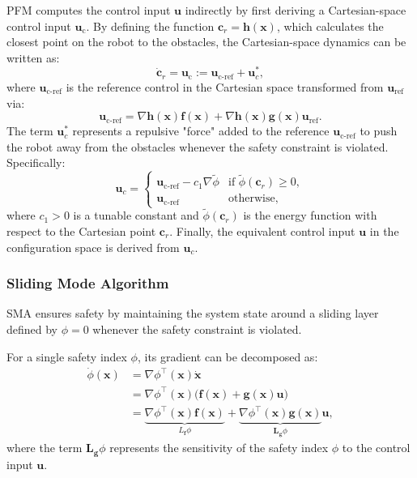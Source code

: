 PFM \cite{khatib1986real} computes the control input $\mathbf{u}$ indirectly by first deriving a Cartesian-space control input $\mathbf{u}_{\text{c}}$. By defining the function $\mathbf{c}_r = \mathbf{h}(\mathbf{x})$, which calculates the closest point on the robot to the obstacles, the Cartesian-space dynamics can be written as:
\begin{equation}
    \dot{\mathbf{c}}_r = \mathbf{u}_{\text{c}} := \mathbf{u}_{\text{c-ref}} + \mathbf{u}_c^*,
\end{equation}
where $\mathbf{u}_{\text{c-ref}}$ is the reference control in the Cartesian space transformed from $\mathbf{u}_{\text{ref}}$ via:
\begin{equation}
    \mathbf{u}_{\text{c-ref}} = \nabla{\mathbf{h}}(\mathbf{x}) \mathbf{f}(\mathbf{x}) + \nabla{\mathbf{h}}(\mathbf{x}) \mathbf{g}(\mathbf{x}) \mathbf{u}_{\text{ref}}.
\end{equation}
The term $\mathbf{u}_c^*$ represents a repulsive "force" added to the reference $\mathbf{u}_{\text{c-ref}}$ to push the robot away from the obstacles whenever the safety constraint is violated. Specifically:
\begin{equation}
    \mathbf{u}_c =
    \begin{cases} 
        \mathbf{u}_{\text{c-ref}} - c_1 \nabla \tilde{\phi} & \text{if } \tilde{\phi}(\mathbf{c}_r) \geq 0, \\
        \mathbf{u}_{\text{c-ref}} & \text{otherwise},
    \end{cases}
\end{equation}
where $c_1 > 0$ is a tunable constant and $\tilde{\phi}(\mathbf{c}_r)$ is the energy function with respect to the Cartesian point $\mathbf{c}_r$. Finally, the equivalent control input $\mathbf{u}$ in the configuration space is derived from $\mathbf{u}_c$.

\subsubsection{Sliding Mode Algorithm}

SMA \cite{gracia2013reactive} ensures safety by maintaining the system state around a sliding layer defined by $\phi = 0$ whenever the safety constraint is violated. 

For a single safety index $\phi$, its gradient can be decomposed as:
\begin{align}
    \dot{\phi}(\mathbf{x}) &= \nabla \phi^\top(\mathbf{x}) \dot{\mathbf{x}} \\ \nonumber
    &= \nabla \phi^\top(\mathbf{x}) \big( \mathbf{f}(\mathbf{x}) + \mathbf{g}(\mathbf{x}) \mathbf{u} \big) \\ \nonumber
    &= \underbrace{\nabla \phi^\top(\mathbf{x}) \mathbf{f}(\mathbf{x})}_{L_\mathbf{f} \phi} + \underbrace{\nabla \phi^\top(\mathbf{x}) \mathbf{g}(\mathbf{x})}_{\mathbf{L}_\mathbf{g} \phi} \mathbf{u},
\end{align}
where the term $\mathbf{L}_\mathbf{g} \phi$ represents the sensitivity of the safety index $\phi$ to the control input $\mathbf{u}$.

